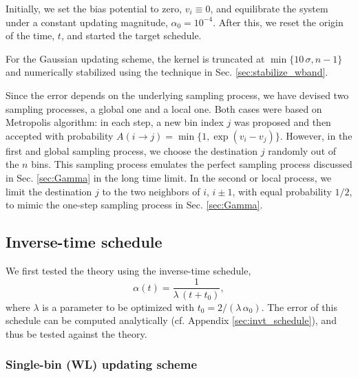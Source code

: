 \documentclass[reprint, floatfix]{revtex4-1}
\begin{document}
Initially,
we set the bias potential to zero,
$v_i \equiv 0$,
%
and equilibrate the system under
a constant updating magnitude,
$\alpha_0 = 10^{-4}$.
%
After this,
we reset the origin of the time, $t$,
and started the target schedule.


For the Gaussian updating scheme,
the kernel is truncated at
$\min\{10 \, \sigma, n - 1\}$
and numerically stabilized
using the technique
in Sec. \ref{sec:stabilize_wband}.



Since the error depends on
the underlying sampling process,
we have devised two sampling processes,
a global one and a local one.
%
Both cases were based on
Metropolis algorithm\cite{metropolis1953, newman, frenkel,
landau_binder}:
%
in each step, a new bin index $j$ was proposed
and then accepted with probability
%
$
A(i \to j) = \min\{ 1, \exp(v_i - v_j) \}.
$
However,
in the first and global sampling process,
we choose the destination $j$
randomly out of the $n$ bins.
%
This sampling process
emulates the perfect sampling process
discussed in Sec. \ref{sec:Gamma}
in the long time limit.
%
In the second or local process,
we limit the destination $j$
to the two neighbors of $i$,
$i \pm 1$, with equal probability $1/2$,
to mimic the one-step sampling process
in Sec. \ref{sec:Gamma}.
%



\subsection{Inverse-time schedule}



We first tested the theory using
the inverse-time schedule,
%
\begin{equation}
\alpha(t) = \frac{1}{\lambda \, (t + t_0) },
\label{eq:alpha_invtlambda}
\end{equation}
%
where $\lambda$ is a parameter to be optimized
with $t_0 = 2/(\lambda \, \alpha_0)$.
%
The error of this schedule
can be computed analytically
(cf. Appendix \ref{sec:invt_schedule}),
and thus be tested against the theory.



\subsubsection{Single-bin (WL) updating scheme}
\end{document}
